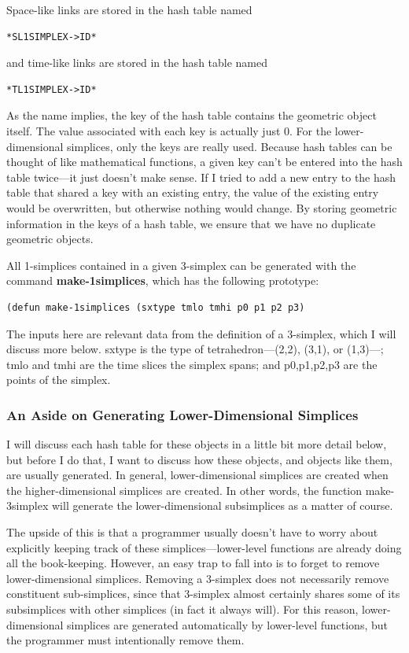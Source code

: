 \documentclass[12pt]{article}
\begin{document}
Space-like links are stored in the hash table named
\begin{lstlisting}
*SL1SIMPLEX->ID*
\end{lstlisting}
and time-like links are stored in the hash table named
\begin{lstlisting}
*TL1SIMPLEX->ID*
\end{lstlisting}

As the name implies, the key of the hash table contains the geometric
object itself. The value associated with each key is actually just
0. For the lower-dimensional simplices, only the keys are really
used. Because hash tables can be thought of like mathematical
functions, a given key can't be entered into the hash table twice---it
just doesn't make sense. If I tried to add a new entry to the hash
table that shared a key with an existing entry, the value of the
existing entry would be overwritten, but otherwise nothing would
change. By storing geometric information in the keys of a hash table,
we ensure that we have no duplicate geometric objects.

All 1-simplices contained in a given 3-simplex can be generated with
the command \textbf{make-1simplices}, which has the following prototype:
\begin{lstlisting}
(defun make-1simplices (sxtype tmlo tmhi p0 p1 p2 p3)
\end{lstlisting}
The inputs here are relevant data from the definition of a 3-simplex,
which I will discuss more below. sxtype is the type of
tetrahedron---(2,2), (3,1), or (1,3)---; tmlo and tmhi are the time
slices the simplex spans; and p0,p1,p2,p3 are the points of the
simplex.

\subsubsection{An Aside on Generating Lower-Dimensional Simplices}
I will discuss each hash table for these objects in a little bit more
detail below, but before I do that, I want to discuss how these
objects, and objects like them, are usually generated. In general,
lower-dimensional simplices are created when the higher-dimensional
simplices are created. In other words, the function make-3simplex will
generate the lower-dimensional subsimplices as a matter of course.

The upside of this is that a programmer usually doesn't have to worry
about explicitly keeping track of these simplices---lower-level
functions are already doing all the book-keeping. However, an easy
trap to fall into is to forget to remove lower-dimensional
simplices. Removing a 3-simplex does not necessarily remove
constituent sub-simplices, since that 3-simplex almost certainly
shares some of its subsimplices with other simplices (in fact it
always will). For this reason, lower-dimensional simplices are
generated automatically by lower-level functions, but the programmer
must intentionally remove them.
\end{document}
